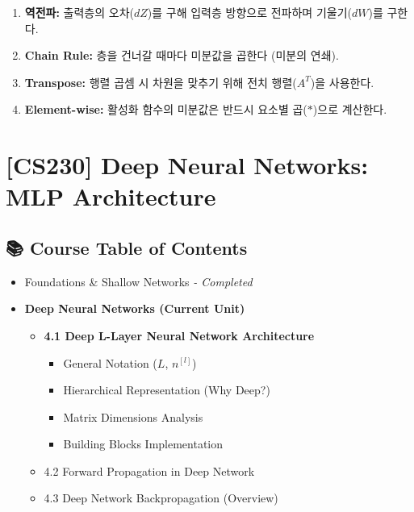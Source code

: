 \documentclass[11pt,a4paper]{book}
\theoremstyle{definition}
\begin{document}
\vspace{0.5cm}

\begin{summarybox}[title={단원 요약 (Cheat Sheet)}]
\begin{enumerate}
    \item \textbf{역전파:} 출력층의 오차($dZ$)를 구해 입력층 방향으로 전파하며 기울기($dW$)를 구한다.
    \item \textbf{Chain Rule:} 층을 건너갈 때마다 미분값을 곱한다 (미분의 연쇄).
    \item \textbf{Transpose:} 행렬 곱셈 시 차원을 맞추기 위해 전치 행렬($A^T$)을 사용한다.
    \item \textbf{Element-wise:} 활성화 함수의 미분값은 반드시 요소별 곱($*$)으로 계산한다.
\end{enumerate}
\end{summarybox}


\chapter{[CS230] Deep Neural Networks: \\ MLP Architecture}
\label{ch:lecture9}

\section*{📚 Course Table of Contents}
\begin{itemize}
    \item[Chapter 1-3.] Foundations \& Shallow Networks \textit{- Completed}
    \item[\textbf{Chapter 4.}] \textbf{Deep Neural Networks (Current Unit)}
    \begin{itemize}
        \item \textbf{4.1 Deep L-Layer Neural Network Architecture}
        \begin{itemize}
            \item General Notation ($L$, $n^{[l]}$)
            \item Hierarchical Representation (Why Deep?)
            \item Matrix Dimensions Analysis
            \item Building Blocks Implementation
        \end{itemize}
        \item 4.2 Forward Propagation in Deep Network
        \item 4.3 Deep Network Backpropagation (Overview)
    \end{itemize}
\end{itemize}
\end{document}
